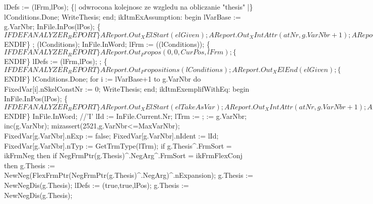                lDefs := (lFrm,lPos);
               \{| odwrocona kolejnosc ze wzgledu na obliczanie "thesis" |\}
               lConditions.Done;
               WriteThesis;
            end;
         ikItmExAssumption:
            begin
               lVarBase := g.VarNbr;
               InFile.InPos(lPos);
               \{$IFDEF ANALYZER_REPORT\}
               AReport.Out_XElStart(elGiven);
               AReport.Out_XIntAttr(atNr, g.VarNbr+1);
               AReport.Out_XAttrEnd;
               \{$ENDIF\}
               ;
               (lConditions);
               InFile.InWord;
               lFrm := ((lConditions));
               \{$IFDEF ANALYZER_REPORT\}
               AReport.Out_Propos(0, 0, CurPos, lFrm);
               \{$ENDIF\}
               lDefs := (lFrm,lPos);
               ;
               \{$IFDEF ANALYZER_REPORT\}
               AReport.Out_Propositions(lConditions);
               AReport.Out_XElEnd(elGiven);
               \{$ENDIF\}
               lConditions.Done;
               for i := lVarBase+1 to g.VarNbr do FixedVar[i].nSkelConstNr := 0;
               WriteThesis;
            end;
         ikItmExemplifWithEq:
            begin
               InFile.InPos(lPos);
               \{$IFDEF ANALYZER_REPORT\}
               AReport.Out_XElStart(elTakeAsVar);
               AReport.Out_XIntAttr(atNr, g.VarNbr+1);
               AReport.Out_XAttrEnd;
               \{$ENDIF\}
               InFile.InWord; //'I'
               lId := InFile.Current.Nr;
               lTrm := ;
                := g.VarNbr;
               inc(g.VarNbr); mizassert(2521,g.VarNbr<=MaxVarNbr);
               FixedVar[g.VarNbr].nExp := false;
               FixedVar[g.VarNbr].nIdent := lId;
               FixedVar[g.VarNbr].nTyp := GetTrmType(lTrm);
               if g.Thesis^.FrmSort = ikFrmNeg then
                  if NegFrmPtr(g.Thesis)^.NegArg^.FrmSort = ikFrmFlexConj then
                     g.Thesis := NewNeg(FlexFrmPtr(NegFrmPtr(g.Thesis)^.NegArg)^.nExpansion);
               g.Thesis := NewNegDis(g.Thesis);
               lDefs := (true,true,lPos);
               g.Thesis := NewNegDis(g.Thesis);
